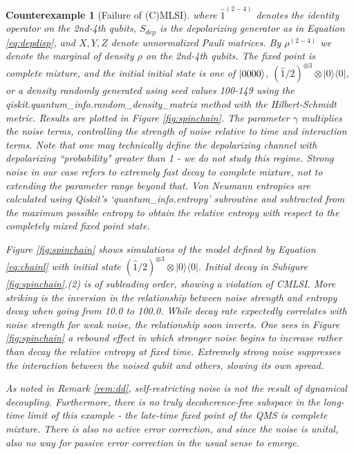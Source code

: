 \documentclass[accepted=2026-02-01, letterpaper]{quantumarticle}
\newcommand{\id}{\hat{1}}
\newtheorem{cexam}[lemma]{Counterexample}
\newcommand{\ketbra}[1]{|{#1}\rangle\langle{#1}|}
\begin{document}
\begin{cexam}[Failure of (C)MLSI]
where $\id^{(2-4)}$ denotes the identity operator on the 2nd-4th qubits, $S_{dep}$ is the depolarizing generator as in Equation \eqref{eq:depdisp}, and $X,Y,Z$ denote unnormalized Pauli matrices. By $\rho^{(2-4)}$ we denote the marginal of density $\rho$ on the 2nd-4th qubits. The fixed point is complete mixture, and the initial initial state is one of $\ket{0000}$, $(\id/2)^{\otimes 3} \otimes \ketbra{0}$, or a density randomly generated using seed values 100-149 using the \textit{qiskit.quantum\_info.random\_density\_matrix} method with the Hilbert-Schmidt metric. Results are plotted in Figure \ref{fig:spinchain}. The parameter $\gamma$ multiplies the noise terms, controlling the strength of noise relative to time and interaction terms. Note that one may technically define the depolarizing channel with depolarizing ``probability" greater than 1 - we do not study this regime. Strong noise in our case refers to extremely fast decay to complete mixture, not to extending the parameter range beyond that. Von Neumann entropies are calculated using Qiskit's `quantum\_info.entropy' subroutine and subtracted from the maximum possible entropy to obtain the relative entropy with respect to the completely mixed fixed point state.

Figure \ref{fig:spinchain} shows simulations of the model defined by Equation \eqref{eq:chainl} with initial state $(\id/2)^{\otimes 3} \otimes \ketbra{0}$. Initial decay in Subigure \ref{fig:spinchain}.(2) is of subleading order, showing a violation of CMLSI. More striking is the inversion in the relationship between noise strength and entropy decay when going from 10.0 to 100.0. While decay rate expectedly correlates with noise strength for weak noise, the relationship soon inverts. One sees in Figure \ref{fig:spinchain} a rebound effect in which stronger noise begins to increase rather than decay the relative entropy at fixed time. Extremely strong noise suppresses the interaction between the noised qubit and others, slowing its own spread.

As noted in Remark \ref{rem:dd}, self-restricting noise is not the result of dynamical decoupling. Furthermore, there is no truly decoherence-free subspace in the long-time limit of this example - the late-time fixed point of the QMS is complete mixture. There is also no active error correction, and since the noise is unital, also no way for passive error correction in the usual sense to emerge.
\end{cexam}
\end{document}
